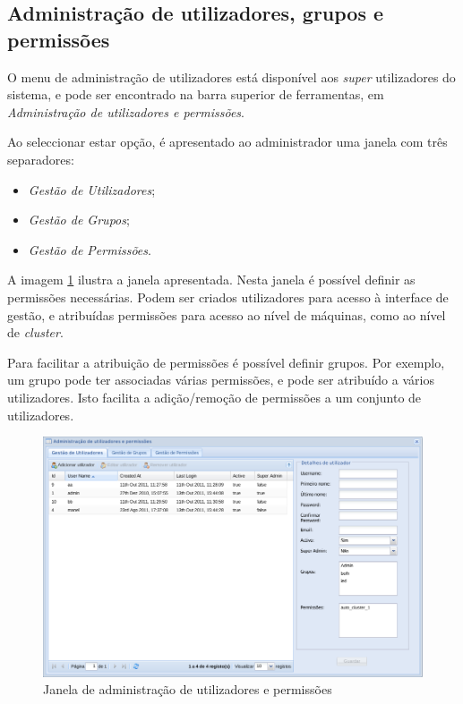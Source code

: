\subsection{Administração de utilizadores, grupos e permissões}
O menu de administração de utilizadores está disponível aos \textit{super} utilizadores do sistema, e pode ser encontrado na barra superior de ferramentas, em \textit{Administração de utilizadores e permissões}.

Ao seleccionar estar opção, é apresentado ao administrador uma janela com três separadores:  
\begin{itemize}
	\item \textit{Gestão de Utilizadores};
	\item \textit{Gestão de Grupos};
	\item \textit{Gestão de Permissões}.
\end{itemize}

A imagem \ref{fig:user_admin} ilustra a janela apresentada. Nesta janela é possível definir as permissões necessárias. Podem ser criados utilizadores para acesso à interface de gestão, e atribuídas permissões para acesso ao nível de máquinas, como ao nível de \textit{cluster}.

Para facilitar a atribuição de permissões é possível definir grupos. Por exemplo, um grupo pode ter associadas várias permissões, e pode ser atribuído a vários utilizadores. Isto facilita a adição/remoção de permissões a um conjunto de utilizadores.

\begin{figure}[H]
        \begin{center}
        \includegraphics[scale=0.4]{screenshots/permissions/user.png}
        \caption{Janela de administração de utilizadores e permissões}
        \label{fig:user_admin}
        \end{center}
\end{figure}

